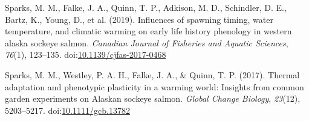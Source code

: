 \documentclass[10pt,a4paper,onecolumn]{article}
\newlength{\cslhangindent}
\newenvironment{CSLReferences}[2] %
 {\begin{list}{}{%
  \setlength{\itemindent}{0pt}
  \setlength{\leftmargin}{0pt}
  \setlength{\parsep}{0pt}
  \ifodd #1
   \setlength{\leftmargin}{\cslhangindent}
   \setlength{\itemindent}{-1\cslhangindent}
  \fi
  \setlength{\itemsep}{#2\baselineskip}}}
 {\end{list}}
\begin{document}
\begin{CSLReferences}{1}{0}
Sparks, M. M., Falke, J. A., Quinn, T. P., Adkison, M. D., Schindler, D.
E., Bartz, K., Young, D., et al. (2019). Influences of spawning timing,
water temperature, and climatic warming on early life history phenology
in western alaska sockeye salmon. \emph{Canadian Journal of Fisheries
and Aquatic Sciences}, \emph{76}(1), 123--135.
doi:\href{https://doi.org/10.1139/cjfas-2017-0468}{10.1139/cjfas-2017-0468}

Sparks, M. M., Westley, P. A. H., Falke, J. A., \& Quinn, T. P. (2017).
Thermal adaptation and phenotypic plasticity in a warming world:
Insights from common garden experiments on Alaskan sockeye salmon.
\emph{Global Change Biology}, \emph{23}(12), 5203--5217.
doi:\href{https://doi.org/10.1111/gcb.13782}{10.1111/gcb.13782}

\end{CSLReferences}
\end{document}
